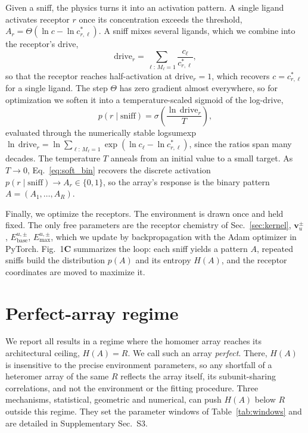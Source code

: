 \documentclass[aps,pre,superscriptaddress,floatfix,longbibliography,linenumbers]{revtex4-2}
\begin{document}
Given a sniff, the physics turns it into an activation pattern. A single
ligand activates receptor $r$ once its concentration exceeds the threshold,
$A_r=\Theta(\ln c-\ln c^*_{r,\ell})$. A sniff mixes several ligands, which we
combine into the receptor's drive,
\begin{equation}
\text{drive}_r = \sum_{\ell:\,M_\ell=1} \frac{c_\ell}{c^*_{r,\ell}},
\label{eq:drive}
\end{equation}
so that the receptor reaches half-activation at $\text{drive}_r=1$, which
recovers $c=c^*_{r,\ell}$ for a single ligand. The step $\Theta$ has zero
gradient almost everywhere, so for optimization we soften it into a
temperature-scaled sigmoid of the log-drive,
\begin{equation}
p(r\mid\text{sniff}) = \sigma\left(\frac{\ln\,\text{drive}_r}{T}\right),
\label{eq:soft_bin}
\end{equation}
evaluated through the numerically stable logsumexp
$\ln\,\text{drive}_r = \ln\sum_{\ell:\,M_\ell=1} \exp(\ln c_\ell - \ln c^*_{r,\ell})$,
since the ratios span many decades. The temperature $T$ anneals from an
initial value to a small target. As $T\to0$, Eq.~\eqref{eq:soft_bin} recovers
the discrete activation $p(r\mid\text{sniff})\to A_r\in\{0,1\}$, so the
array's response is the binary pattern $A=(A_1,\dots,A_R)$.

Finally, we optimize the receptors. The environment is drawn once and held
fixed. The only free parameters are the receptor chemistry of
Sec.~\ref{sec:kernel}, $\mathbf v_u^{\pm}$, $E_\text{base}^{u,\pm}$,
$E_\text{max}^{u,\pm}$, which we update by backpropagation with the Adam
optimizer in PyTorch. Fig.~1\textbf{C} summarizes the loop: each sniff yields
a pattern $A$, repeated sniffs build the distribution $p(A)$ and its entropy
$H(A)$, and the receptor coordinates are moved to maximize it.

\section{Perfect-array regime}
\label{sec:perfect}

We report all results in a regime where the homomer array reaches its
architectural ceiling, $H(A)=R$. We call such an array \emph{perfect}. There,
$H(A)$ is insensitive to the precise environment parameters, so any shortfall
of a heteromer array of the same $R$ reflects the array itself, its
subunit-sharing correlations, and not the environment or the fitting
procedure. Three mechanisms, statistical, geometric and numerical, can push
$H(A)$ below $R$ outside this regime. They set the parameter windows of
Table~\ref{tab:windows} and are detailed in Supplementary Sec.~S3.
\end{document}
